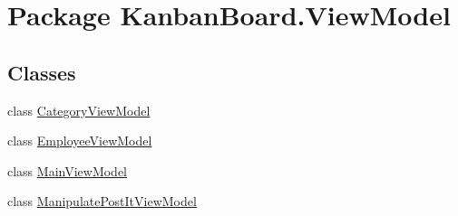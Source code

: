 \hypertarget{namespace_kanban_board_1_1_view_model}{}\section{Package Kanban\+Board.\+View\+Model}
\label{namespace_kanban_board_1_1_view_model}
\subsection*{Classes}
\begin{DoxyCompactItemize}
\item 
class \hyperlink{class_kanban_board_1_1_view_model_1_1_category_view_model}{Category\+View\+Model}
\item 
class \hyperlink{class_kanban_board_1_1_view_model_1_1_employee_view_model}{Employee\+View\+Model}
\item 
class \hyperlink{class_kanban_board_1_1_view_model_1_1_main_view_model}{Main\+View\+Model}
\item 
class \hyperlink{class_kanban_board_1_1_view_model_1_1_manipulate_post_it_view_model}{Manipulate\+Post\+It\+View\+Model}
\end{DoxyCompactItemize}

